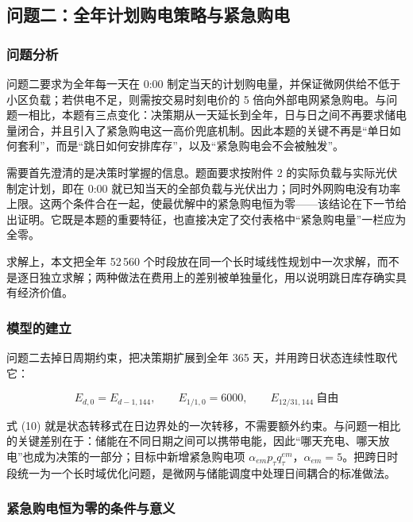 \subsection{问题二：全年计划购电策略与紧急购电}

\subsubsection{问题分析}

问题二要求为全年每一天在 0:00 制定当天的计划购电量，并保证微网供给不低于小区负载；若供电不足，则需按交易时刻电价的 5 倍向外部电网紧急购电。与问题一相比，本题有三点变化：决策期从一天延长到全年，日与日之间不再要求储电量闭合，并且引入了紧急购电这一高价兜底机制。因此本题的关键不再是“单日如何套利”，而是“跳日如何安排库存”，以及“紧急购电会不会被触发”。

需要首先澄清的是决策时掌握的信息。题面要求按附件 2 的实际负载与实际光伏制定计划，即在 0:00 就已知当天的全部负载与光伏出力；同时外网购电没有功率上限。这两个条件合在一起，使最优解中的紧急购电恒为零——该结论在下一节给出证明。它既是本题的重要特征，也直接决定了交付表格中“紧急购电量”一栏应为全零。

求解上，本文把全年 52\,560 个时段放在同一个长时域线性规划中一次求解，而不是逐日独立求解；两种做法在费用上的差别被单独量化，用以说明跳日库存确实具有经济价值。

\subsubsection{模型的建立}

问题二去掉日周期约束，把决策期扩展到全年 365 天，并用跨日状态连续性取代它：

\begin{equation}
E_{d,0}=E_{d-1,144},\qquad E_{1/1,0}=6000,\qquad E_{12/31,144}\ \text{自由}
\end{equation}

式 (10) 就是状态转移式在日边界处的一次转移，不需要额外约束。与问题一相比的关键差别在于：储能在不同日期之间可以携带电能，因此“哪天充电、哪天放电”也成为决策的一部分；目标中新增紧急购电项 $\alpha_{em}p_{\tau}q^{em}_{\tau}$，$\alpha_{em}=5$。把跨日时段统一为一个长时域优化问题，是微网与储能调度中处理日间耦合的标准做法\cite{ref-silvente-2015-rolling-horizon,ref-holjevac-2017-receding-horizon,ref-hu-2020-mpc-overview,ref-finnah-2021-da-intraday-adp}。

\subsubsection{紧急购电恒为零的条件与意义}

